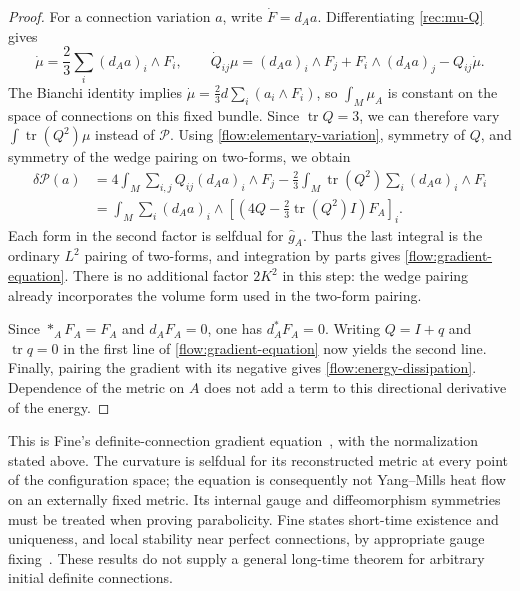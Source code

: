 \documentclass[11pt]{article}
\numberwithin{equation}{section}
\theoremstyle{definition}
\theoremstyle{remark}
\begin{document}
\begin{proof}
For a connection variation $a$, write $\dot F=d_Aa$.  Differentiating
\eqref{rec:mu-Q} gives
\begin{equation}
 \dot\mu=\frac23\sum_i(d_Aa)_i\wedge F_i,
 \qquad
 \dot Q_{ij}\mu=(d_Aa)_i\wedge F_j+F_i\wedge(d_Aa)_j
                         -Q_{ij}\dot\mu.
 \label{flow:elementary-variation}
\end{equation}
The Bianchi identity implies
$\dot\mu=\frac23d\sum_i(a_i\wedge F_i)$, so $\int_M\mu_A$ is
constant on the space of connections on this fixed bundle.
Since $\operatorname{tr}Q=3$, we can therefore vary
$\int\operatorname{tr}(Q^2)\mu$ instead of $\mathcal P$.
Using \eqref{flow:elementary-variation}, symmetry of $Q$, and symmetry
of the wedge pairing on two-forms, we obtain
\begin{align}
 \delta\mathcal P(a)
 &=4\int_M\sum_{i,j}Q_{ij}(d_Aa)_i\wedge F_j
       -\frac23\int_M\operatorname{tr}(Q^2)
                     \sum_i(d_Aa)_i\wedge F_i\nonumber\\
 &=\int_M\sum_i(d_Aa)_i\wedge
        \left[\left(4Q-\frac23\operatorname{tr}(Q^2)I\right)F_A\right]_i.
 \label{flow:first-variation}
\end{align}
Each form in the second factor is selfdual for $\widehat g_A$.
Thus the last integral is the ordinary $L^2$ pairing of two-forms,
and integration by parts gives \eqref{flow:gradient-equation}.
There is no additional factor $2K^2$ in this step: the wedge pairing
already incorporates the volume form used in the two-form pairing.

Since $*_AF_A=F_A$ and $d_AF_A=0$, one has $d_A^*F_A=0$.
Writing $Q=I+q$ and $\operatorname{tr}q=0$ in the first line of
\eqref{flow:gradient-equation} now yields the second line.
Finally, pairing the gradient with its negative gives
\eqref{flow:energy-dissipation}.  Dependence of the metric on $A$
does not add a term to this directional derivative of the energy.
\end{proof}

This is Fine's definite-connection gradient equation~\cite{Fine2011},
with the normalization stated above.
The curvature is selfdual for its reconstructed metric at every point of
the configuration space; the equation is consequently not Yang--Mills
heat flow on an externally fixed metric.  Its internal gauge and
diffeomorphism symmetries must be treated when proving parabolicity.
Fine states short-time existence and uniqueness, and local stability
near perfect connections, by appropriate gauge fixing~\cite{Fine2011}.
These results do not supply a general long-time theorem for arbitrary
initial definite connections.
\end{document}
